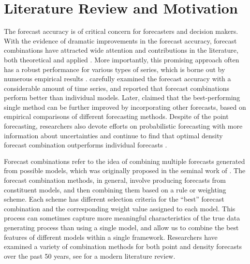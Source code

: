 \documentclass{monashthesis}
\begin{document}
\hypertarget{literature-review-and-motivation}{%
\section{Literature Review and Motivation}\label{literature-review-and-motivation}}

The forecast accuracy is of critical concern for forecasters and decision makers. With the evidence of dramatic improvements in the forecast accuracy, forecast combinations have attracted wide attention and contributions in the literature, both theoretical and applied \autocite{C89,T06}. More importantly, this promising approach often has a robust performance for various types of series, which is borne out by numerous empirical results \autocite{GA11}. \textcite{MACF82} carefully examined the forecast accuracy with a considerable amount of time series, and reported that forecast combinations perform better than individual models. Later, \textcite{SW98} claimed that the best-performing single method can be further improved by incorporating other forecasts, based on empirical comparisons of different forecasting methods. Despite of the point forecasting, researchers also devote efforts on probabilistic forecasting with more information about uncertainties and continue to find that optimal density forecast combination outperforms individual forecasts \autocites[e.g.,][]{HM07,GA11}.

Forecast combinations refer to the idea of combining multiple forecasts generated from possible models, which was originally proposed in the seminal work of \textcite{BG69}. The forecast combination methods, in general, involve producing forecasts from constituent models, and then combining them based on a rule or weighting scheme. Each scheme has different selection criteria for the ``best'' forecast combination and the corresponding weight value assigned to each model. This process can sometimes capture more meaningful characteristics of the true data generating process than using a single model, and allow us to combine the best features of different models within a single framework. Researchers have examined a variety of combination methods for both point and density forecasts over the past 50 years, see \textcite{WHLK22} for a modern literature review.
\end{document}
